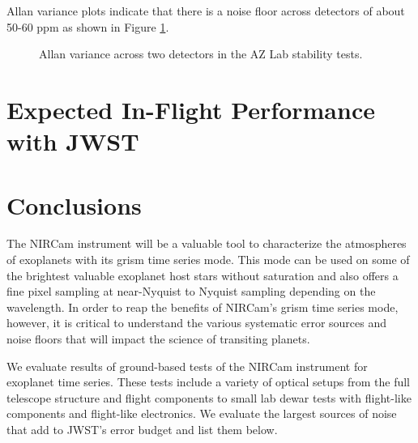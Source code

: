 \documentclass{aastex62}
\begin{document}
Allan variance plots indicate that there is a noise floor across detectors of about 50-60 ppm as shown in Figure \ref{fig:allanVarianceAZ04AZ05}.

\begin{figure}
{}
\caption{Allan variance across two detectors in the AZ Lab stability tests.}\label{fig:allanVarianceAZ04AZ05}
\end{figure}


\acknowledgments

\clearpage
\section{Expected In-Flight Performance with JWST}

\section{Conclusions}
The NIRCam instrument will be a valuable tool to characterize the atmospheres of exoplanets with its grism time series mode.
This mode can be used on some of the brightest valuable exoplanet host stars without saturation and also offers a fine pixel sampling at near-Nyquist to Nyquist sampling depending on the wavelength.
In order to reap the benefits of NIRCam's grism time series mode, however, it is critical to understand the various systematic error sources and noise floors that will impact the science of transiting planets.

We evaluate results of ground-based tests of the NIRCam instrument for exoplanet time series.
These tests include a variety of optical setups from the full telescope structure and flight components to small lab dewar tests with flight-like components and flight-like electronics.
We evaluate the largest sources of noise that add to JWST's error budget and list them below.
\end{document}
